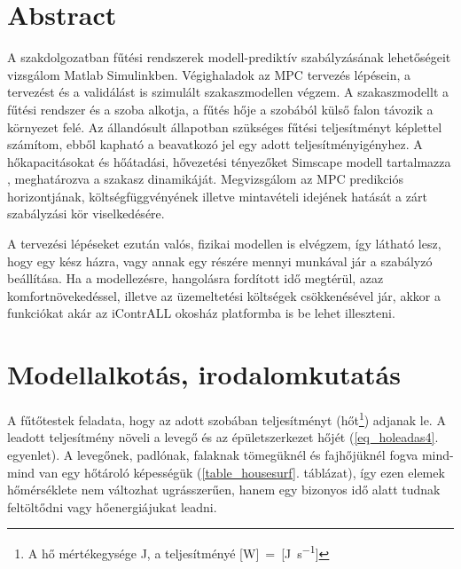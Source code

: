 \chapter*{Abstract}

A szakdolgozatban fűtési rendszerek modell-prediktív szabályzásának lehetőségeit vizsgálom Matlab Simulinkben. %
Végighaladok az MPC tervezés lépésein, a tervezést és a validálást is szimulált szakaszmodellen végzem. A szakaszmodellt a fűtési rendszer és a szoba alkotja, a fűtés hője a szobából külső falon távozik a környezet felé. Az állandósult állapotban szükséges fűtési teljesítményt képlettel számítom, ebből kapható a beavatkozó jel egy adott teljesítményigényhez. A hőkapacitásokat és hőátadási, hővezetési tényezőket Simscape modell tartalmazza%
, meghatározva a szakasz dinamikáját. Megvizsgálom az MPC predikciós horizontjának, költségfüggvényének illetve mintavételi idejének hatását a zárt szabályzási kör viselkedésére.  %

A tervezési lépéseket ezután valós, fizikai modellen is elvégzem, így látható lesz, hogy egy kész házra, vagy annak egy részére mennyi munkával jár a szabályzó beállítása. Ha a modellezésre, hangolásra fordított idő megtérül, azaz komfortnövekedéssel, illetve az üzemeltetési költségek csökkenésével jár, akkor a funkciókat akár az iContrALL okosház platformba is be lehet illeszteni.



\chapter{Modellalkotás, irodalomkutatás}


A fűtőtestek feladata, hogy az adott szobában teljesítményt (hőt\footnote{A hő mértékegysége \si{\joule}, a teljesítményé [\si{\watt}]~=~[\si[per-mode=fraction]{\joule\per\second}]}) adjanak le. A leadott teljesítmény növeli a levegő és az épületszerkezet hőjét (\ref{eq_holeadas4}. egyenlet). A levegőnek, padlónak, falaknak tömegüknél és fajhőjüknél fogva mind-mind van egy hőtároló képességük (\ref{table_housesurf}. táblázat), így ezen elemek hőmérséklete nem változhat ugrásszerűen, hanem egy bizonyos idő alatt tudnak feltöltődni vagy hőenergiájukat leadni. %

